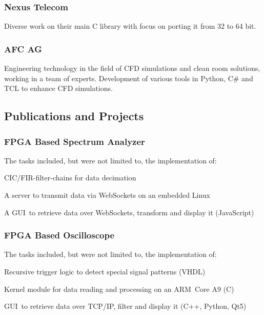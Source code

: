 \documentclass[]{resume}
\begin{document}
\begin{timeline}
\subsubsection{Nexus Telecom}
Diverse work on their main C library with focus on porting it from 32 to 64 bit.
\sectionsep

\subsubsection{AFC AG}
Engineering technology in the field of CFD simulations and clean room solutions, working in a team of experts.
Development of various tools in Python, C\# and TCL to enhance CFD simulations.
\sectionsep



\subsection{Publications and Projects}

\subsubsection{FPGA Based Spectrum Analyzer}
The tasks included, but were not limited to, the implementation of:
\begin{tightemize}
\item CIC/FIR-filter-chains for data decimation
\item A server to transmit data via WebSockets on an embedded Linux
\item A GUI to retrieve data over WebSockets, transform and display it (JavaScript)
\end{tightemize}
\sectionsep

\subsubsection{FPGA Based Oscilloscope}
The tasks included, but were not limited to, the implementation of:
\begin{tightemize}
\item Recursive trigger logic to detect special signal patterns (VHDL)
\item Kernel module for data reading and processing on an ARM Core A9 (C)
\item GUI to retrieve data over TCP/IP, filter and display it (C++, Python, Qt5)
\end{tightemize}
\sectionsep


\end{timeline}
\end{document}
